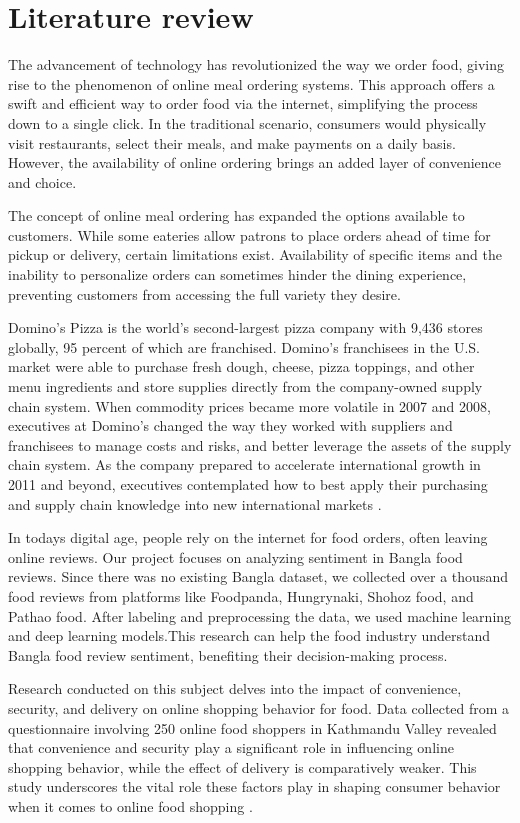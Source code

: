 \section{Literature review}
The advancement of technology has revolutionized the way we order food, giving rise to the phenomenon of online meal ordering systems. This approach offers a swift and efficient way to order food via the internet, simplifying the process down to a single click. In the traditional scenario, consumers would physically visit restaurants, select their meals, and make payments on a daily basis. However, the availability of online ordering brings an added layer of convenience and choice.

The concept of online meal ordering has expanded the options available to customers. While some eateries allow patrons to place orders ahead of time for pickup or delivery, certain limitations exist. Availability of specific items and the inability to personalize orders can sometimes hinder the dining experience, preventing customers from accessing the full variety they desire.

Domino's Pizza is the world's second-largest pizza company with 9,436 stores globally, 95 percent of which are franchised. Domino's franchisees in the U.S. market were able to purchase fresh dough, cheese, pizza toppings, and other menu ingredients and store supplies directly from the company-owned supply chain system. When commodity prices became more volatile in 2007 and 2008, executives at Domino's changed the way they worked with suppliers and franchisees to manage costs and risks, and better leverage the assets of the supply chain system. As the company prepared to accelerate international growth in 2011 and beyond, executives contemplated how to best apply their purchasing and supply chain knowledge into new international markets \cite{bell2012domino}.

In todays digital age, people rely on the internet for food orders, often leaving online reviews.
Our project focuses on analyzing sentiment in Bangla food reviews. Since there was no existing
Bangla dataset, we collected over a thousand food reviews from platforms like Foodpanda,
Hungrynaki, Shohoz food, and Pathao food. After labeling and preprocessing the data, we used
machine learning and deep learning models.This research can help the food industry
understand Bangla food review sentiment, benefiting their decision-making process\cite{junaid2022bangla}.

Research conducted on this subject delves into the impact of convenience, security, and delivery on online shopping behavior for food. Data collected from a questionnaire involving 250 online food shoppers in Kathmandu Valley revealed that convenience and security play a significant role in influencing online shopping behavior, while the effect of delivery is comparatively weaker. This study underscores the vital role these factors play in shaping consumer behavior when it comes to online food shopping \cite{manandhar19online}.

